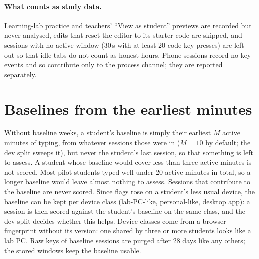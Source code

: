 \paragraph{What counts as study data.} Learning-lab practice and teachers' ``View as
student'' previews are recorded but never analysed, edits that reset the editor to its
starter code are skipped, and sessions with no active window (30\,s with at least
20 code key presses) are left out so that idle tabs do not count as honest hours. Phone
sessions record no key events and so contribute only to the process channel; they are
reported separately.

\section{Baselines from the earliest minutes}
\label{sec:baseline}
Without baseline weeks, a student's baseline is simply their earliest $M$ active minutes
of typing, from whatever sessions those were in ($M = 10$ by default; the dev split
sweeps it), but never the student's last session, so that something is left to assess.
A student whose baseline would cover less than three active minutes is not scored.
Most pilot students typed well under 20 active minutes in total, so a longer baseline
would leave almost nothing to assess. Sessions that contribute to the baseline are never scored. Since flags rose
on a student's less usual device, the baseline can be kept per device class (lab-PC-like,
personal-like, desktop app): a session is then scored against the student's baseline on
the same class, and the dev split decides whether this helps. Device classes come from a
browser fingerprint without its version: one shared by three or more students looks
like a lab PC. Raw keys of baseline sessions are purged after 28 days like any others;
the stored windows keep the baseline usable.

